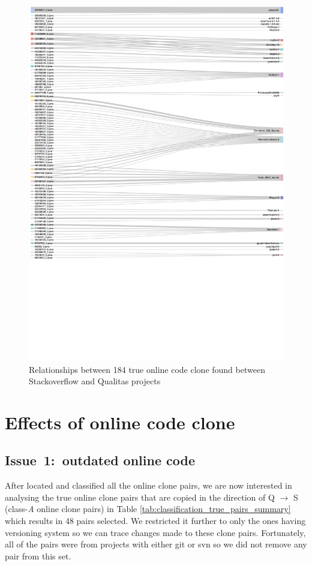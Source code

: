 \documentclass{sig-alternate-05-2015}
\begin{document}
\begin{figure}
	\centering
	\includegraphics[width=1\linewidth]{Sankey_proj}
	\caption{Relationships between 184 true online code clone found between Stackoverflow and Qualitas projects}
	\label{fig:sankey}
\end{figure}


\section{Effects of online code clone}

\subsection{Issue~1:~outdated online code}
After located and classified all the online clone pairs, we are now interested in analysing the true online clone pairs that are copied in the direction of Q $\rightarrow$ S (class-\textit{A} online clone pairs) in Table \ref{tab:classification_true_pairs_summary} which results in 48 pairs selected. We restricted it further to only the ones having versioning system so we can trace changes made to these clone pairs. Fortunately, all of the pairs were from projects with either git or svn so we did not remove any pair from this set. 
\end{document}
